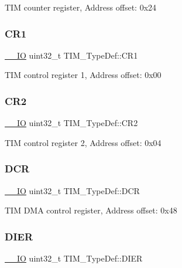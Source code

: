 T\+IM counter register, Address offset\+: 0x24 \mbox{\label{struct_t_i_m___type_def_a9dafc8b03e8497203a8bb395db865328}} 
\subsubsection{\texorpdfstring{C\+R1}{CR1}}
{\footnotesize\ttfamily \hyperlink{core__sc300_8h_aec43007d9998a0a0e01faede4133d6be}{\+\_\+\+\_\+\+IO} uint32\+\_\+t T\+I\+M\+\_\+\+Type\+Def\+::\+C\+R1}

T\+IM control register 1, Address offset\+: 0x00 \mbox{\label{struct_t_i_m___type_def_a6b1ae85138ed91686bf63699c61ef835}} 
\subsubsection{\texorpdfstring{C\+R2}{CR2}}
{\footnotesize\ttfamily \hyperlink{core__sc300_8h_aec43007d9998a0a0e01faede4133d6be}{\+\_\+\+\_\+\+IO} uint32\+\_\+t T\+I\+M\+\_\+\+Type\+Def\+::\+C\+R2}

T\+IM control register 2, Address offset\+: 0x04 \mbox{\label{struct_t_i_m___type_def_a7efe9ea8067044cac449ada756ebc2d1}} 
\subsubsection{\texorpdfstring{D\+CR}{DCR}}
{\footnotesize\ttfamily \hyperlink{core__sc300_8h_aec43007d9998a0a0e01faede4133d6be}{\+\_\+\+\_\+\+IO} uint32\+\_\+t T\+I\+M\+\_\+\+Type\+Def\+::\+D\+CR}

T\+IM D\+MA control register, Address offset\+: 0x48 \mbox{\label{struct_t_i_m___type_def_a22a33c78ca5bec0e3e8559164a82b8ef}} 
\subsubsection{\texorpdfstring{D\+I\+ER}{DIER}}
{\footnotesize\ttfamily \hyperlink{core__sc300_8h_aec43007d9998a0a0e01faede4133d6be}{\+\_\+\+\_\+\+IO} uint32\+\_\+t T\+I\+M\+\_\+\+Type\+Def\+::\+D\+I\+ER}


